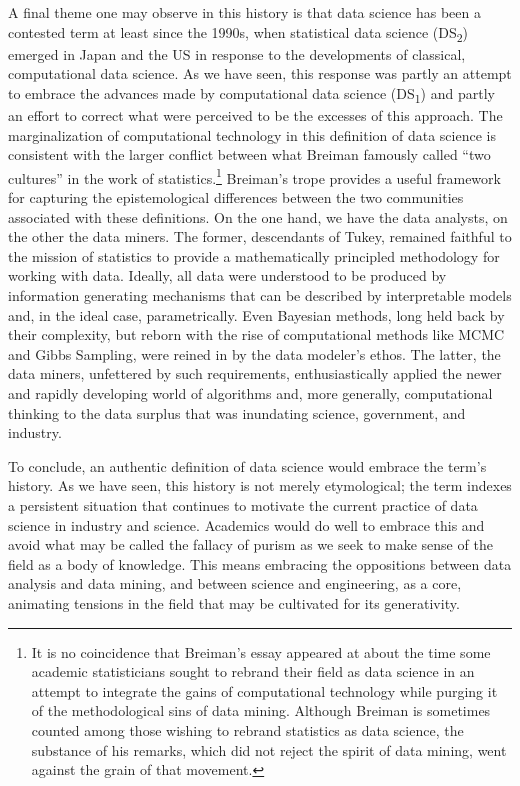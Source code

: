 \documentclass[
  letterpaper,
]{report}
\begin{document}
A final theme one may observe in this history is that data science has
been a contested term at least since the 1990s, when statistical data
science (DS\textsubscript{2}) emerged in Japan and the US in response to
the developments of classical, computational data science. As we have
seen, this response was partly an attempt to embrace the advances made
by computational data science (DS\textsubscript{1}) and partly an effort
to correct what were perceived to be the excesses of this approach. The
marginalization of computational technology in this definition of data
science is consistent with the larger conflict between what Breiman
famously called ``two cultures'' in the work of statistics.\footnote{It
  is no coincidence that Breiman's essay appeared at about the time some
  academic statisticians sought to rebrand their field as data science
  in an attempt to integrate the gains of computational technology while
  purging it of the methodological sins of data mining. Although Breiman
  is sometimes counted among those wishing to rebrand statistics as data
  science, the substance of his remarks, which did not reject the spirit
  of data mining, went against the grain of that movement.} Breiman's
trope provides a useful framework for capturing the epistemological
differences between the two communities associated with these
definitions. On the one hand, we have the data analysts, on the other
the data miners. The former, descendants of Tukey, remained faithful to
the mission of statistics to provide a mathematically principled
methodology for working with data. Ideally, all data were understood to
be produced by information generating mechanisms that can be described
by interpretable models and, in the ideal case, parametrically. Even
Bayesian methods, long held back by their complexity, but reborn with
the rise of computational methods like MCMC and Gibbs Sampling, were
reined in by the data modeler's ethos. The latter, the data miners,
unfettered by such requirements, enthusiastically applied the newer and
rapidly developing world of algorithms and, more generally,
computational thinking to the data surplus that was inundating science,
government, and industry.

To conclude, an authentic definition of data science would embrace the
term's history. As we have seen, this history is not merely
etymological; the term indexes a persistent situation that continues to
motivate the current practice of data science in industry and science.
Academics would do well to embrace this and avoid what may be called the
fallacy of purism as we seek to make sense of the field as a body of
knowledge. This means embracing the oppositions between data analysis
and data mining, and between science and engineering, as a core,
animating tensions in the field that may be cultivated for its
generativity.
\end{document}
